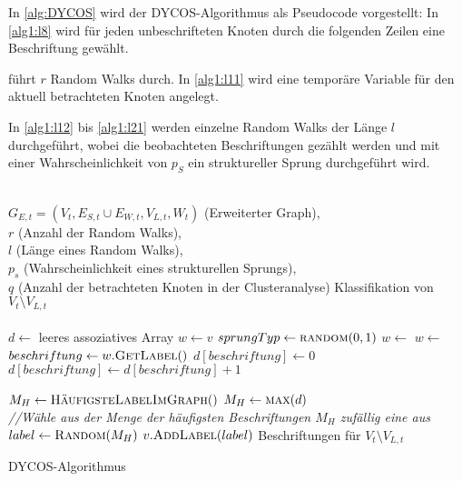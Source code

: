 In \cref{alg:DYCOS} wird der DYCOS-Algorithmus als 
Pseudocode vorgestellt:
In \cref{alg1:l8} wird für jeden unbeschrifteten Knoten
durch die folgenden Zeilen eine Beschriftung gewählt.

 führt $r$ Random Walks durch.
In \cref{alg1:l11} wird eine temporäre Variable für den aktuell
betrachteten Knoten angelegt.

In \cref{alg1:l12} bis \cref{alg1:l21} werden einzelne Random Walks
der Länge $l$ durchgeführt, wobei die beobachteten Beschriftungen 
gezählt werden und mit einer Wahrscheinlichkeit von $p_S$ ein 
struktureller Sprung durchgeführt wird.

\begin{algorithm}[ht]
    \begin{algorithmic}[1]
        \Require \\$G_{E,t} = (V_t, E_{S,t} \cup E_{W,t}, V_{L,t}, W_t)$ (Erweiterter Graph),\\
                 $r$ (Anzahl der Random Walks),\\
                 $l$ (Länge eines Random Walks),\\
                 $p_s$ (Wahrscheinlichkeit eines strukturellen Sprungs),\\
                 $q$ (Anzahl der betrachteten Knoten in der Clusteranalyse)
        \Ensure  Klassifikation von $V_t \setminus V_{L,t}$\\
        \\

        \label{alg1:l8}
            \State $d \gets $ leeres assoziatives Array
            \label{alg1:l10}
                \State $w \gets v$\label{alg1:l11}
                \label{alg1:l12}
                    \State $sprungTyp \gets \Call{random}{0, 1}$
                        \State $w \gets$ 
                    \Else
                        \State $w \gets$ 
                    \EndIf
                    \State $beschriftung \gets w.\Call{GetLabel}{ }$
                        \State $d[beschriftung] \gets 0$
                    \EndIf
                    \State $d[beschriftung] \gets d[beschriftung] + 1$
                \EndFor\label{alg1:l21}
            \EndFor

             
                \State $M_H \gets \Call{HäufigsteLabelImGraph}{ }$
            \Else
                \State $M_H \gets \Call{max}{d}$
            \EndIf
            \\
            \State \textit{//Wähle aus der Menge der häufigsten Beschriftungen $M_H$ zufällig eine aus}
            \State $label \gets \Call{Random}{M_H}$ 
            \State $v.\Call{AddLabel}{label}$ 
        \EndFor
        \State \Return Beschriftungen für $V_t \setminus V_{L,t}$
    \end{algorithmic}
\caption{DYCOS-Algorithmus}
\label{alg:DYCOS}
\end{algorithm}


